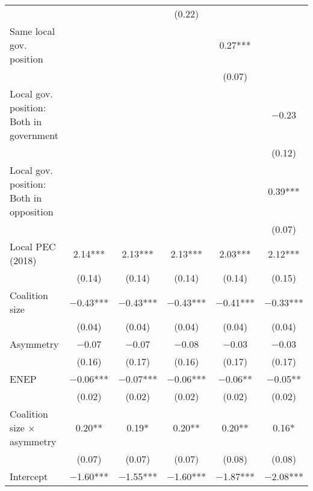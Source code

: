 \begin{tabular}[t]{lccccc}
&                 &                 & (\num{0.22})   &                 &                 \\
Same local gov. position                &                 &                 &                 & \num{0.27}***  &                 \\
&                 &                 &                 & (\num{0.07})   &                 \\
Local gov. position: Both in government &                 &                 &                 &                 & \num{-0.23}   \\
&                 &                 &                 &                 & (\num{0.12})   \\
Local gov. position: Both in opposition &                 &                 &                 &                 & \num{0.39}***  \\
&                 &                 &                 &                 & (\num{0.07})   \\
Local PEC (2018)                        & \num{2.14}***  & \num{2.13}***  & \num{2.13}***  & \num{2.03}***  & \num{2.12}***  \\
& (\num{0.14})   & (\num{0.14})   & (\num{0.14})   & (\num{0.14})   & (\num{0.15})   \\
Coalition size                          & \num{-0.43}*** & \num{-0.43}*** & \num{-0.43}*** & \num{-0.41}*** & \num{-0.33}*** \\
& (\num{0.04})   & (\num{0.04})   & (\num{0.04})   & (\num{0.04})   & (\num{0.04})   \\
Asymmetry                               & \num{-0.07}    & \num{-0.07}    & \num{-0.08}    & \num{-0.03}    & \num{-0.03}    \\
& (\num{0.16})   & (\num{0.17})   & (\num{0.16})   & (\num{0.17})   & (\num{0.17})   \\
ENEP                                    & \num{-0.06}*** & \num{-0.07}*** & \num{-0.06}*** & \num{-0.06}**  & \num{-0.05}**  \\
& (\num{0.02})   & (\num{0.02})   & (\num{0.02})   & (\num{0.02})   & (\num{0.02})   \\
Coalition size × asymmetry              & \num{0.20}**   & \num{0.19}*    & \num{0.20}**   & \num{0.20}**   & \num{0.16}*    \\
& (\num{0.07})   & (\num{0.07})   & (\num{0.07})   & (\num{0.08})   & (\num{0.08})   \\
Intercept                             & \num{-1.60}*** & \num{-1.55}*** & \num{-1.60}*** & \num{-1.87}*** & \num{-2.08}*** \\

\end{tabular}
